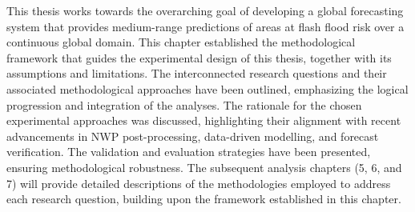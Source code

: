 This thesis works towards the overarching goal of developing a global forecasting system that provides medium-range predictions of areas at flash flood risk over a continuous global domain. This chapter established the methodological framework that guides the experimental design of this thesis, together with its assumptions and limitations. The interconnected research questions and their associated methodological approaches have been outlined, emphasizing the logical progression and integration of the analyses. The rationale for the chosen experimental approaches was discussed, highlighting their alignment with recent advancements in NWP post-processing, data-driven modelling, and forecast verification. The validation and evaluation strategies have been presented, ensuring methodological robustness. The subsequent analysis chapters (5, 6, and 7) will provide detailed descriptions of the methodologies employed to address each research question, building upon the framework established in this chapter. 